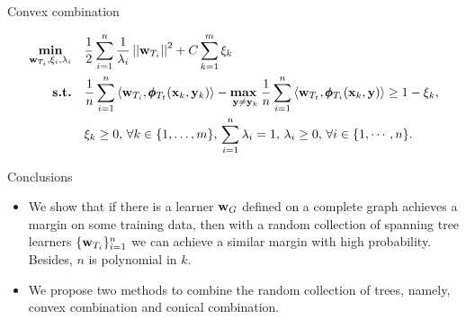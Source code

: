 \documentclass[first=dgreen,second=purple,logo=yellowexc]{aaltoslides}
\begin{document}
\begin{frame}[allowframebreaks]{Convex combination}
\begin{itemize}
\begin{align*}
			\underset{\mathbf {w}_{T_i},\xi_i,\lambda_i}{\textbf{min}} & \quad \frac{1}{2}\sum_{i=1}^{n}\frac{1}{\lambda_{i}}\left|\left| \mathbf {w}_{T_i} \right|\right|^2 + C\sum_{k=1}^{m}\xi_k\\
			\textbf{s.t.} & \quad \frac{1}{{n}}\sum_{i=1}^{n}{ \langle \mathbf {w}_{T_i}, \pmb \phi_{T_t}(\mathbf {x}_k,\mathbf {y}_k) \rangle} - \underset{\mathbf {y} \neq \mathbf {y}_k}{\textbf{max}\ } \frac{1}{{n}}\sum_{i=1}^{n}{\langle \mathbf {w}_{T_t}, \pmb \phi_{T_i}(\mathbf {x}_k,\mathbf {y}) \rangle } \geq 1 -  \xi_k, \\
			& \quad \xi_k\ge0,\, \forall k \in \{ 1,\dots,m \},\, \sum_{i=1}^{n}\lambda_i=1,\,\lambda_i\ge0,\,\forall i\in\{1,\cdots,n\}.
		\end{align*}
	\end{itemize}
\end{frame}


%
\begin{frame}{Conclusions}
	\begin{itemize}\footnotesize
		\item We show that if there is a learner $\mathbf {w}_G$ defined on a complete graph achieves a margin on some training data, then with a random collection of spanning tree learners $\{\mathbf {w}_{T_i}\}_{i=1}^n$ we can achieve a similar margin with high probability. Besides, $n$ is polynomial in $k$.
		\item We propose two methods to combine the random collection of trees, namely, convex combination and conical combination.
	\end{itemize}
\end{frame}




\iffalse
\begin{frame}[allowframebreaks]{Bibliography}
	
	
\end{frame}
\fi
\end{document}
